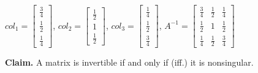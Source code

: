 \documentclass[12pt,a4paper]{article}
\begin{document}
$
col_1 = 
\begin{bmatrix}
  \frac{3}{4} \\
  \frac{1}{2} \\
  \frac{1}{4}
\end{bmatrix}
$, 
$
col_2 =
\begin{bmatrix}
  \frac{1}{2} \\
  1 \\
  \frac{1}{2}
\end{bmatrix}
$,
$
col_3 =
\begin{bmatrix}
  \frac{1}{4} \\
  \frac{1}{2} \\
  \frac{3}{4}
\end{bmatrix}
$,
$
A^{-1} =
\begin{bmatrix}
  \frac{3}{4} & \frac{1}{2} & \frac{1}{4} \\
  \frac{1}{2} & 1 & \frac{1}{2} \\
  \frac{1}{4} & \frac{1}{2} & \frac{3}{4}
\end{bmatrix}
$

\textbf{Claim.} A matrix is invertible if and only if (iff.) it is nonsingular.
\end{document}
